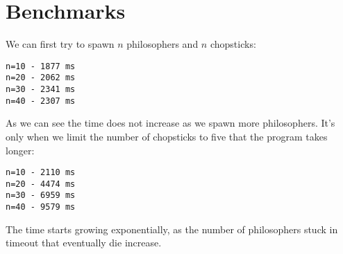 \documentclass[a4paper,11pt]{article}
\begin{document}
\section*{Benchmarks}

We can first try to spawn $n$ philosophers and $n$ chopsticks:
\begin{verbatim}
n=10 - 1877 ms
n=20 - 2062 ms
n=30 - 2341 ms
n=40 - 2307 ms
\end{verbatim}

As we can see the time does not increase as we spawn more philosophers. It's only when we limit the number of chopsticks to five that the program takes longer:
\begin{verbatim}
n=10 - 2110 ms
n=20 - 4474 ms
n=30 - 6959 ms
n=40 - 9579 ms
\end{verbatim}

The time starts growing exponentially, as the number of philosophers stuck in timeout that eventually die increase.
\end{document}

